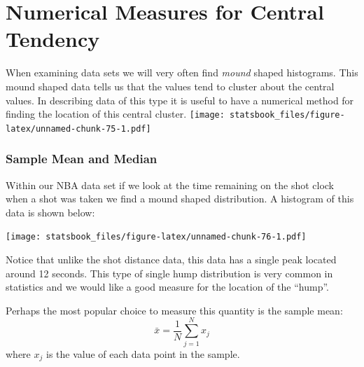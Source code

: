\documentclass[
]{book}
\newenvironment{Shaded}{\begin{snugshade}}{\end{snugshade}}
\newcommand{\AttributeTok}[1]{\textcolor[rgb]{0.77,0.63,0.00}{#1}}
\newcommand{\ConstantTok}[1]{\textcolor[rgb]{0.00,0.00,0.00}{#1}}
\newcommand{\DecValTok}[1]{\textcolor[rgb]{0.00,0.00,0.81}{#1}}
\newcommand{\FunctionTok}[1]{\textcolor[rgb]{0.00,0.00,0.00}{#1}}
\newcommand{\NormalTok}[1]{#1}
\newcommand{\OtherTok}[1]{\textcolor[rgb]{0.56,0.35,0.01}{#1}}
\newcommand{\SpecialCharTok}[1]{\textcolor[rgb]{0.00,0.00,0.00}{#1}}
\newcommand{\StringTok}[1]{\textcolor[rgb]{0.31,0.60,0.02}{#1}}
\theoremstyle{definition}
\theoremstyle{definition}
\theoremstyle{definition}
\theoremstyle{definition}
\theoremstyle{remark}
\begin{document}
\hypertarget{numerical-measures-for-central-tendency}{%
\section{Numerical Measures for Central Tendency}\label{numerical-measures-for-central-tendency}}

When examining data sets we will very often find \emph{mound} shaped histograms. This mound shaped data tells us that the values tend to cluster about the central values. In describing data of this type it is useful to have a numerical method for finding the location of this central cluster.
\texttt{[image: statsbook\_files/figure-latex/unnamed-chunk-75-1.pdf]}

\hypertarget{sample-mean-and-median}{%
\subsubsection{Sample Mean and Median}\label{sample-mean-and-median}}

Within our NBA data set if we look at the time remaining on the shot clock when a shot was taken we find a mound shaped distribution. A histogram of this data is shown below:

\begin{Shaded}
\end{Shaded}

\texttt{[image: statsbook\_files/figure-latex/unnamed-chunk-76-1.pdf]}

Notice that unlike the shot distance data, this data has a single peak located around 12 seconds. This type of single hump distribution is very common in statistics and we would like a good measure for the location of the ``hump''.

Perhaps the most popular choice to measure this quantity is the sample mean: \[\bar{x}=\frac{1}{N}\sum_{j=1}^N x_j\] where \(x_j\) is the value of each data point in the sample.
\end{document}
